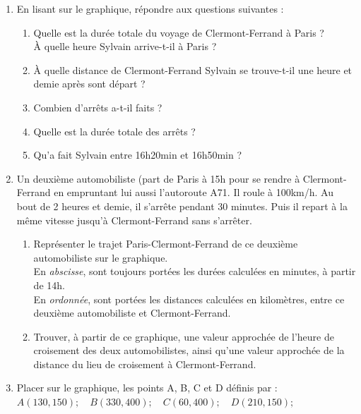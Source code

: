 \begin{enumerate}
   \item En lisant sur le graphique, répondre aux questions suivantes : 

       \begin{enumerate}
          \renewcommand{\theenumii}{\alph{enumii}}
           \item Quelle est la durée totale du voyage de Clermont-Ferrand à Paris ? \\
                 À quelle heure Sylvain arrive-t-il à Paris ? 
           \item À quelle distance de Clermont-Ferrand Sylvain se trouve-t-il 
                 une heure et demie après sont départ ? 
           \item Combien d'arrêts a-t-il faits ? 
           \item Quelle est la durée totale des arrêts ? 
           \item Qu'a fait Sylvain entre 16h20min et 16h50min ?       
       \end{enumerate}   
   \item Un deuxième automobiliste (part de Paris à 15h pour se rendre à Clermont-Ferrand en 
         empruntant lui aussi l'autoroute A71. Il roule à 100km/h. Au bout de 2 heures et demie,
          il s'arrête pendant 30 minutes. Puis il repart à la même vitesse jusqu'à 
          Clermont-Ferrand sans s'arrêter. 
       \begin{enumerate}
           \item Représenter le trajet Paris-Clermont-Ferrand de ce deuxième automobiliste 
                 sur le graphique. \\
                 En {\it abscisse}, sont toujours portées les durées calculées en minutes, 
                 à partir de 14h. \\
                 En {\it ordonnée}, sont portées les distances calculées en kilomètres, 
                 entre ce deuxième automobiliste et Clermont-Ferrand. 
           \item Trouver, à partir de ce graphique, une valeur approchée de l'heure de croisement
                 des deux automobilistes, ainsi qu'une valeur approchée de la distance 
                 du lieu de croisement à Clermont-Ferrand.  
       \end{enumerate}   
   \item Placer sur le graphique, les points A, B, C et D définis par : \\
         $ A(130,150) ; \quad B(330,400) ; \quad C(60,400) ; \quad D(210, 150) ;  $\\

\end{enumerate}
